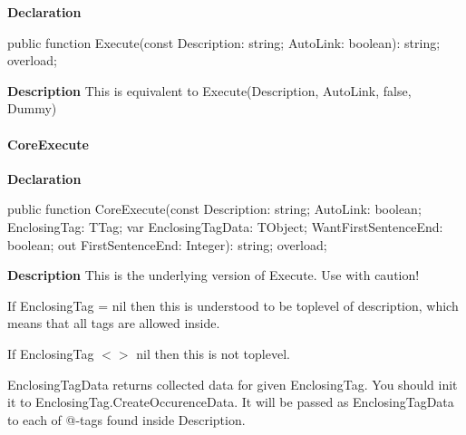 \documentclass{report}
\newif\ifpdf
\begin{document}
\label{PasDoc_TagManager.TTagManager-Execute}
\begin{list}{}{
\setlength{\itemindent}{0cm}
\setlength{\listparindent}{0cm}
\setlength{\leftmargin}{\evensidemargin}
\addtolength{\leftmargin}{\tmplength}
\settowidth{\labelsep}{X}
\addtolength{\leftmargin}{\labelsep}
\setlength{\labelwidth}{\tmplength}
}
\item[\textbf{Declaration}\hfill]
\ifpdf
\begin{flushleft}
\fi
\begin{ttfamily}
public function Execute(const Description: string; AutoLink: boolean): string; overload;\end{ttfamily}

\ifpdf
\end{flushleft}
\fi

\par
\item[\textbf{Description}]
This is equivalent to Execute(Description, AutoLink, false, Dummy)

\end{list}
\paragraph*{CoreExecute}\hspace*{\fill}

\label{PasDoc_TagManager.TTagManager-CoreExecute}
\begin{list}{}{
\setlength{\itemindent}{0cm}
\setlength{\listparindent}{0cm}
\setlength{\leftmargin}{\evensidemargin}
\addtolength{\leftmargin}{\tmplength}
\settowidth{\labelsep}{X}
\addtolength{\leftmargin}{\labelsep}
\setlength{\labelwidth}{\tmplength}
}
\item[\textbf{Declaration}\hfill]
\ifpdf
\begin{flushleft}
\fi
\begin{ttfamily}
public function CoreExecute(const Description: string; AutoLink: boolean; EnclosingTag: TTag; var EnclosingTagData: TObject; WantFirstSentenceEnd: boolean; out FirstSentenceEnd: Integer): string; overload;\end{ttfamily}

\ifpdf
\end{flushleft}
\fi

\par
\item[\textbf{Description}]
This is the underlying version of Execute. Use with caution!

If EnclosingTag = nil then this is understood to be toplevel of description, which means that all tags are allowed inside.

If EnclosingTag {$<$}{$>$} nil then this is not toplevel.

EnclosingTagData returns collected data for given EnclosingTag. You should init it to EnclosingTag.CreateOccurenceData. It will be passed as EnclosingTagData to each of @{-}tags found inside Description.

\end{list}
\end{document}
